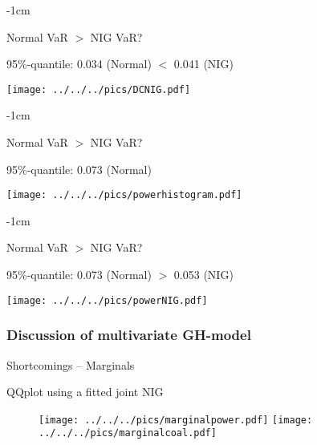 {-1cm}
\begin{center}
Normal VaR $>$ NIG VaR?
\end{center}
95\%-quantile: \hspace{1cm} 0.034 (Normal)  \hspace{1cm}$<$ \hspace{1cm} 0.041 (NIG)\\
\begin{center}
\texttt{[image: ../../../pics/DCNIG.pdf]}
\end{center}

{-1cm}
\begin{center}
Normal VaR $>$ NIG VaR?
\end{center}
95\%-quantile: \hspace{1cm} 0.073 (Normal) \hspace{1cm} \\
\begin{center}
\texttt{[image: ../../../pics/powerhistogram.pdf]}
\end{center}

{-1cm}
\begin{center}
Normal VaR $>$ NIG VaR?
\end{center}
95\%-quantile: \hspace{1cm} 0.073 (Normal) \hspace{1cm}$>$ \hspace{1cm} 0.053 (NIG) \\
\begin{center}
\texttt{[image: ../../../pics/powerNIG.pdf]}
\end{center}

 \subsubsection{Discussion of multivariate GH-model}

{Shortcomings -- Marginals} %
\begin{center}
QQplot using a fitted joint NIG
\begin{figure}
\begin{center}
\texttt{[image: ../../../pics/marginalpower.pdf]}
\texttt{[image: ../../../pics/marginalcoal.pdf]}
\end{center}
\end{figure}
\end{center}

